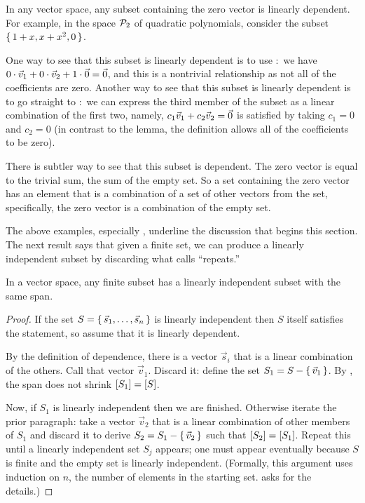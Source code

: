 \begin{example} \label{ex:SetWithZeroVecLD}
In any vector space, any subset containing the zero vector is linearly 
dependent.
For example, in the space $\mathcal{P}_2$ of quadratic polynomials, 
consider the subset $\mbox{$\{\,1+x,x+x^2,0\,\}$}$.

One way to see that this subset is linearly 
dependent is to use :~we have  
$0\cdot\vec{v}_1+0\cdot\vec{v}_2+1\cdot\vec{0}=\vec{0}$, and this is a nontrivial
relationship as not all of the coefficients are zero.
Another way to see that this subset is
linearly dependent is to go straight to :~we
can express the third member of the subset
as a linear combination of the 
first two, namely, $c_1\vec{v}_1+c_2\vec{v}_2=\vec{0}$ is 
satisfied by taking $c_1=0$ and $c_2=0$
(in contrast to the lemma, the definition allows all of the coefficients to 
be zero).

There is subtler way to see that this subset is dependent.
The zero vector is equal to the trivial sum, 
the sum of the empty set.
So a set containing the zero vector has an element that
is a combination of a set of other vectors from the 
set, specifically,
the zero vector is a combination of the empty set.
\end{example}

The above examples, especially ,
underline the discussion that begins this section.
The next result 
says that given a finite set,
we can produce a linearly independent subset
by discarding what 
calls ``repeats.''


\begin{theorem}
\label{th:AlwaysAnLDSubset}
In a vector space,
any finite subset has a linearly independent subset with the same span.
\end{theorem}

\begin{proof}
If the set  \( S=\mbox{$\{\, \vec{s}_1,\dots,\vec{s}_n\,\}$} \) is linearly independent
then $S$ itself satisfies the statement, so 
assume that it is linearly dependent.

By the definition of dependence,
there is a vector \( \vec{s}_i \) that is a linear combination of
the others.
Call that vector \( \vec{v}_1 \).
Discard it:
define the set \( S_1=S-\mbox{$\{\,\vec{v}_1\,\}$} \).
By , the span does not
shrink \( \relax [S_1\relax ]=\relax [S\relax ] \).

Now, if \( S_1 \) is linearly independent then we are finished.
Otherwise iterate the prior paragraph: 
take a vector $\vec{v}_2$ 
that is a linear combination of
other members of $S_1$ and discard it
to derive \( S_2=S_1-\mbox{$\{\,\vec{v}_2\,\}$} \)
such that \( \relax [S_2\relax ]=\relax [S_1\relax ] \).
Repeat this until a linearly independent set $S_j$ appears;
one must appear eventually because \( S \) is finite
and the empty set is linearly independent.
(Formally, this argument uses
induction on $n$, the number of elements in the starting set.
 asks for the details.)
\end{proof}

